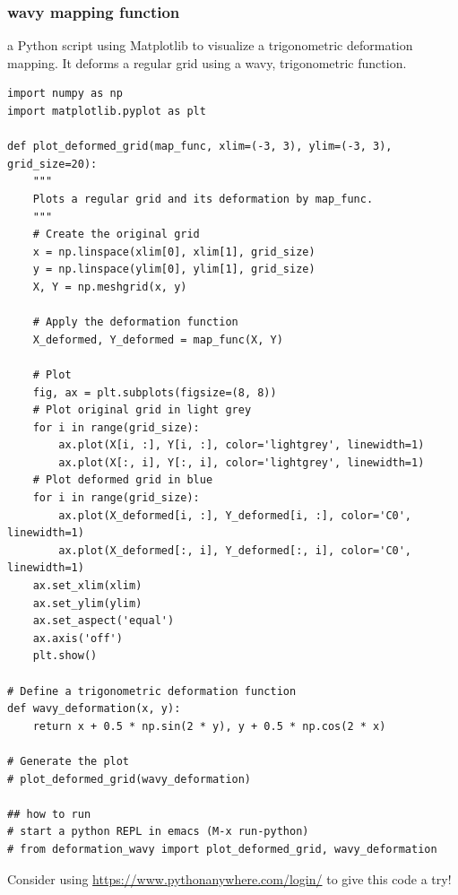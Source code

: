 \documentclass[11pt]{article}
\begin{document}
\subsubsection*{wavy mapping function}
\label{sec:orgb334d1d}
a Python script using Matplotlib to visualize a trigonometric deformation mapping. It deforms a regular grid using a wavy, trigonometric function.

\begin{verbatim}
import numpy as np
import matplotlib.pyplot as plt

def plot_deformed_grid(map_func, xlim=(-3, 3), ylim=(-3, 3), grid_size=20):
    """
    Plots a regular grid and its deformation by map_func.
    """
    # Create the original grid
    x = np.linspace(xlim[0], xlim[1], grid_size)
    y = np.linspace(ylim[0], ylim[1], grid_size)
    X, Y = np.meshgrid(x, y)

    # Apply the deformation function
    X_deformed, Y_deformed = map_func(X, Y)

    # Plot
    fig, ax = plt.subplots(figsize=(8, 8))
    # Plot original grid in light grey
    for i in range(grid_size):
        ax.plot(X[i, :], Y[i, :], color='lightgrey', linewidth=1)
        ax.plot(X[:, i], Y[:, i], color='lightgrey', linewidth=1)
    # Plot deformed grid in blue
    for i in range(grid_size):
        ax.plot(X_deformed[i, :], Y_deformed[i, :], color='C0', linewidth=1)
        ax.plot(X_deformed[:, i], Y_deformed[:, i], color='C0', linewidth=1)
    ax.set_xlim(xlim)
    ax.set_ylim(ylim)
    ax.set_aspect('equal')
    ax.axis('off')
    plt.show()

# Define a trigonometric deformation function
def wavy_deformation(x, y):
    return x + 0.5 * np.sin(2 * y), y + 0.5 * np.cos(2 * x)

# Generate the plot
# plot_deformed_grid(wavy_deformation)

## how to run
# start a python REPL in emacs (M-x run-python)
# from deformation_wavy import plot_deformed_grid, wavy_deformation
\end{verbatim}

Consider using \url{https://www.pythonanywhere.com/login/} to give this code a try!
\end{document}
